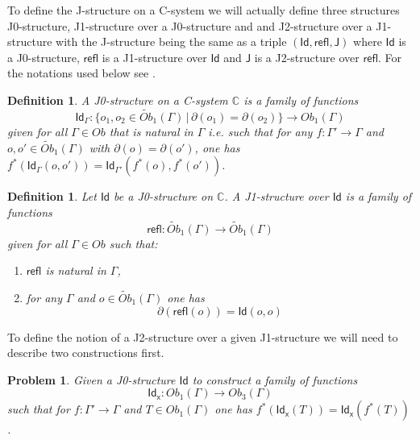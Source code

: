 \documentclass[12pt]{article}
\numberwithin{equation}{section}
\newenvironment{eq}{\begin{equation}}{\end{equation}}
\newtheorem{definition}[proposition]{Definition}
\newtheorem{problem}[proposition]{Problem}
\newcommand{\llabel}[1]{\label{#1}}
\newcommand{\sr}{\rightarrow}
\newcommand{\wt}{\widetilde}
\newcommand{\aCC}{{\mathbb C}}  %
\newcommand{\Id}{\mathsf{Id}} %
\newcommand{\refl}{\mathsf{refl}}
\newcommand{\J}{\mathsf{J}}
\newcommand{\Idx}{\mathsf{Id_x}} %
\begin{document}
To define the J-structure on a C-system we will actually define three
structures J0-structure, J1-structure over a J0-structure and and J2-structure
over a J1-structure with the J-structure being the same as a triple
$(\Id,\refl,\J)$ where $\Id$ is a J0-structure, $\refl$ is a J1-structure over
$\Id$ and $\J$ is a J2-structure over $\refl$. For the notations used below see
\cite{fromunivwithPi}.
%
\begin{definition}
\llabel{2015.03.27.def1}
A J0-structure on a C-system $\aCC$ is a family of functions 
%
$$\Id_{\Gamma}:\{o_1,o_2\in \wt{Ob}_1(\Gamma)\,|\,\partial(o_1)=\partial(o_2)\}\sr Ob_1(\Gamma)$$
%
given for all $\Gamma\in Ob$ that is natural in $\Gamma$ i.e. such that for any
$f:\Gamma'\sr \Gamma$ and $o,o'\in \wt{Ob}_1(\Gamma)$ with
$\partial(o)=\partial(o')$, one has
$f^*(\Id_{\Gamma}(o,o'))=\Id_{\Gamma'}(f^*(o),f^*(o'))$.
\end{definition}
%
\begin{definition}
\llabel{2015.03.27.def2}
Let $\Id$ be a J0-structure on $\aCC$. A J1-structure over $\Id$ is a family of
functions
%
$$\refl:\wt{Ob}_1(\Gamma)\sr \wt{Ob}_1(\Gamma)$$
%
given for all $\Gamma\in Ob$ such that:
%
\begin{enumerate}
\item $\refl$ is natural in $\Gamma$,
\item for any $\Gamma$ and $o\in \wt{Ob}_1(\Gamma)$ one has 
%
\begin{eq}
\llabel{2015.03.27.eq8}
\partial(\refl(o))=\Id(o,o)
\end{eq}
\end{enumerate}
\end{definition}
%
To define the notion of a J2-structure over a given J1-structure we will need
to describe two constructions first.
%
\begin{problem}
\llabel{2015.03.27.prob1} Given a J0-structure $\Id$ to construct a family of
functions
%
$$\Idx:Ob_1(\Gamma)\sr Ob_3(\Gamma)$$
%
such that for $f:\Gamma'\sr \Gamma$ and $T\in Ob_1(\Gamma)$ one has
$f^*(\Idx(T))=\Idx(f^*(T))$.
\end{problem}
%
\end{document}
